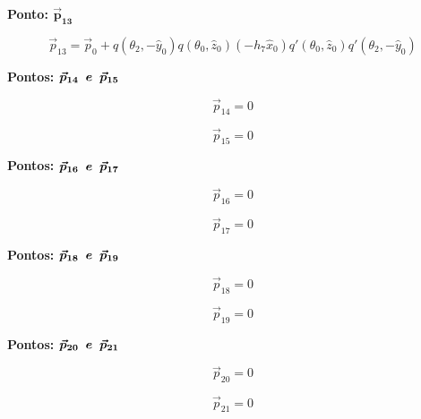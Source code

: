 \documentclass[10pt,a4paper]{report}
\begin{document}
\textbf{Ponto: {$\boldsymbol{\vec{p}_{13}}$}}

\begin{equation}
\vec{p}_{13} = \vec{p}_{0} + q(\theta_{2}, -\hat{y}_{0}) q(\theta_{0}, \hat{z}_{0}) (- h_{7} \hat{x}_{0}) q'(\theta_{0}, \hat{z}_{0}) q'(\theta_{2}, -\hat{y}_{0})
\label{eq:p13}
\end{equation}

\textbf{Pontos: {$\boldsymbol{\vec{p}_{14} \hspace{0.2cm} e \hspace{0.2cm} \vec{p}_{15}}$}}

\begin{equation}
\vec{p}_{14} = 0
\label{eq:p14}
\end{equation}

\begin{equation}
\vec{p}_{15} = 0
\label{eq:p15}
\end{equation}

\textbf{Pontos: {$\boldsymbol{\vec{p}_{16} \hspace{0.2cm} e \hspace{0.2cm} \vec{p}_{17}}$}}

\begin{equation}
\vec{p}_{16} = 0
\label{eq:p16}
\end{equation}

\begin{equation}
\vec{p}_{17} = 0
\label{eq:p17}
\end{equation}

\textbf{Pontos: {$\boldsymbol{\vec{p}_{18} \hspace{0.2cm} e \hspace{0.2cm} \vec{p}_{19}}$}}

\begin{equation}
\vec{p}_{18} = 0
\label{eq:p18}
\end{equation}

\begin{equation}
\vec{p}_{19} = 0
\label{eq:p19}
\end{equation}

\textbf{Pontos: {$\boldsymbol{\vec{p}_{20} \hspace{0.2cm} e \hspace{0.2cm} \vec{p}_{21}}$}}

\begin{equation}
\vec{p}_{20} = 0
\label{eq:p20}
\end{equation}

\begin{equation}
\vec{p}_{21} = 0
\label{eq:p21}
\end{equation}
\end{document}
